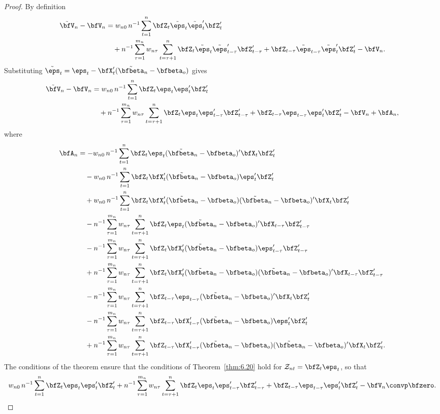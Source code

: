 \begin{proof}
By definition
\begin{align*}
  \tilde{\bfV}_n - \bfV_n &= w_{n0}\,n^{-1}\sum_{t=1}^{n}\bfZ_t\tilde{\eps}_t\tilde{\eps}_t'\bfZ_t' \\
    &\quad + n^{-1}\sum_{\tau=1}^{m_n}w_{n\tau}\sum_{t=\tau+1}^{n}\bfZ_t\tilde{\eps}_t\tilde{\eps}_{t-\tau}'\bfZ_{t-\tau}' + \bfZ_{t-\tau}\tilde{\eps}_{t-\tau}\tilde{\eps}_t'\bfZ_t' - \bfV_n.
\end{align*}
Substituting $\tilde{\eps}_t = \eps_t - \bfX_t'(\tilde{\bfbeta}_n - \bfbeta_o)$ gives
\begin{align*}
  \tilde{\bfV}_n - \bfV_n &= w_{n0}\, n^{-1}\sum_{t=1}^{n}\bfZ_t\eps_t\eps_t'\bfZ_t' \\
    &\quad + n^{-1}\sum_{\tau=1}^{m_n}w_{n\tau}\sum_{t=\tau+1}^{n}\bfZ_t\eps_t\eps_{t-\tau}'\bfZ_{t-\tau}' + \bfZ_{t-\tau}\eps_{t-\tau}\eps_t'\bfZ_t' - \bfV_n + \bfA_n,
\end{align*}
where
\begin{align*}
  \bfA_n &= -w_{n0}\, n^{-1}\sum_{t=1}^{n}\bfZ_t\eps_t(\tilde{\bfbeta}_n - \bfbeta_o)'\bfX_t\bfZ_t' \\
    &\quad - w_{n0}\, n^{-1}\sum_{t=1}^{n}\bfZ_t\bfX_t'(\tilde{\bfbeta}_n - \bfbeta_o)\eps_t'\bfZ_t' \\
    &\quad + w_{n0}\, n^{-1}\sum_{t=1}^{n}\bfZ_t\bfX_t'(\tilde{\bfbeta}_n - \bfbeta_o)(\tilde{\bfbeta}_n - \bfbeta_o)'\bfX_t\bfZ_t' \\
    &\quad - n^{-1}\sum_{\tau=1}^{m_n}w_{n\tau}\sum_{t=\tau+1}^{n}\bfZ_t\eps_t(\tilde{\bfbeta}_n - \bfbeta_o)'\bfX_{t-\tau}\bfZ_{t-\tau}' \\
    &\quad - n^{-1}\sum_{\tau=1}^{m_n}w_{n\tau}\sum_{t=\tau+1}^{n}\bfZ_t\bfX_t'(\tilde{\bfbeta}_n - \bfbeta_o)\eps_{t-\tau}'\bfZ_{t-\tau}' \\
    &\quad + n^{-1}\sum_{\tau=1}^{m_n}w_{n\tau}\sum_{t=\tau+1}^{n}\bfZ_t\bfX_t'(\tilde{\bfbeta}_n - \bfbeta_o)(\tilde{\bfbeta}_n - \bfbeta_o)'\bfX_{t-\tau}\bfZ_{t-\tau}' \\
    &\quad - n^{-1}\sum_{\tau=1}^{m_n}w_{n\tau}\sum_{t=\tau+1}^{n}\bfZ_{t-\tau}\eps_{t-\tau}(\tilde{\bfbeta}_n - \bfbeta_o)'\bfX_t\bfZ_t' \\
    &\quad - n^{-1}\sum_{\tau=1}^{m_n}w_{n\tau}\sum_{t=\tau+1}^{n}\bfZ_{t-\tau}\bfX_{t-\tau}'(\tilde{\bfbeta}_n - \bfbeta_o)\eps_t'\bfZ_t' \\
    &\quad + n^{-1}\sum_{\tau=1}^{m_n}w_{n\tau}\sum_{t=\tau+1}^{n}\bfZ_{t-\tau}\bfX_{t-\tau}'(\tilde{\bfbeta}_n - \bfbeta_o)(\tilde{\bfbeta}_n - \bfbeta_o)'\bfX_t\bfZ_t'.
\end{align*}
The conditions of the theorem ensure that the conditions of Theorem~\ref{thm:6.20} hold for $\mathcal{Z}_{nt} = \bfZ_t\eps_t$, so that
\[
  w_{n0}\, n^{-1}\sum_{t=1}^{n}\bfZ_t\eps_t\eps_t'\bfZ_t' + n^{-1}\sum_{\tau=1}^{m_n}w_{n\tau}\sum_{t=\tau+1}^{n}\bfZ_t\eps_t\eps_{t-\tau}'\bfZ_{t-\tau}' + \bfZ_{t-\tau}\eps_{t-\tau}\eps_t'\bfZ_t' - \bfV_n \convp \bfzero.
\]


\end{proof}
